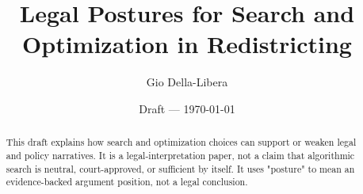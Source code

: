 \documentclass[12pt]{article}
\title{Legal Postures for Search and Optimization in Redistricting}
\author{Gio Della-Libera}
\date{Draft --- \today}
\begin{document}
\maketitle

\begin{abstract}
This draft explains how search and optimization choices can support or weaken
legal and policy narratives. It is a legal-interpretation paper, not a claim
that algorithmic search is neutral, court-approved, or sufficient by itself. It
uses "posture" to mean an evidence-backed argument position, not a legal
conclusion.
\end{abstract}








\nocite{bisect-u15-plan}


\end{document}
